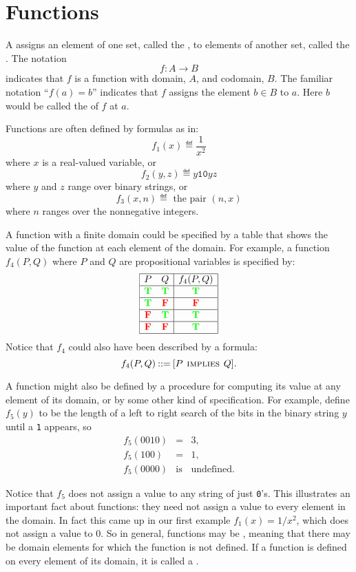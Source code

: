 \section{Functions}\label{funcsubsec}

A  assigns an element of one set, called the
, to elements of another set, called the .
The notation
\[
f: A \to B
\]
indicates that $f$ is a function with domain, $A$, and codomain, $B$.  The
familiar notation ``$f(a) = b$'' indicates that $f$ assigns the element $b
\in B$ to $a$.  Here $b$ would be called the  of $f$ at
 $a$.

Functions are often defined by formulas as in:
\[
f_1(x) \eqdef \frac{1}{x^2}
\]
where $x$ is a real-valued variable, or
\[
f_2(y,z) \eqdef y\mathtt{10}yz
\]
where $y$ and $z$ range over binary strings, or
\[
f_3(x, n) \eqdef \text{ the pair } (n, x)
\]
where $n$ ranges over the nonnegative integers.

A function with a finite domain could be specified by a table that shows
the value of the function at each element of the domain.  For example, a function
$f_4(P,Q)$ where $P$ and $Q$ are propositional variables is specified by:
\[\begin{array}{|cc|c|}
\hline
P & Q & f_4(P,Q)\\
\hline \textcolor{green}{\mathbf{T}} & \textcolor{green}{\mathbf{T}} & \textcolor{green}{\mathbf{T}}\\
\hline \textcolor{green}{\mathbf{T}} & \textcolor{red}{\mathbf{F}} & \textcolor{red}{\mathbf{F}}\\
\hline \textcolor{red}{\mathbf{F}} & \textcolor{green}{\mathbf{T}} & \textcolor{green}{\mathbf{T}}\\
\hline \textcolor{red}{\mathbf{F}} & \textcolor{red}{\mathbf{F}} & \textcolor{green}{\mathbf{T}}\\
\hline
\end{array}\]
Notice that $f_4$ could also have been described by a formula:
\[
f_4(P,Q)  \mathbin{::=} [P \mathbin{\mathrm{\textsc{\,implies\,}}} Q].
\]

A function might also be defined by a procedure for computing its value at
any element of its domain, or by some other kind of specification.  For
example, define $f_5(y)$ to be the length of a left to right search of the
bits in the binary string $y$ until a \texttt{1} appears, so
\begin{eqnarray*}
f_5(0010) & = &  3,\\
f_5(100)  & = & 1,\\
f_5(0000) & \text{is} & \text{undefined}.
\end{eqnarray*}

Notice that $f_5$ does not assign a value to any string of just \texttt{0}'s.
This illustrates an important fact about functions: they need not assign a
value to every element in the domain.  In fact this came up in our first
example $f_1(x)=1/x^2$, which does not assign a value to $0$.  So in
general, functions may be , meaning that there may be domain
elements for which the function is not defined.  If a function is defined
on every element of its domain, it is called a .

